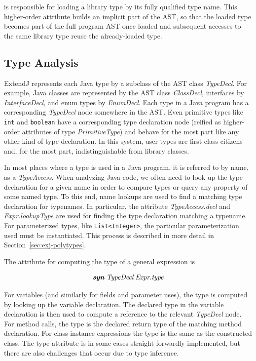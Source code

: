 \documentclass[10pt, twoside, openright]{book}
\newcommand{\secref}[1]{Section~\ref{#1}}
\begin{document}
\noindent
is responsible for loading a library type by its fully qualified type name.
This higher-order attribute builds an implicit part of the AST, so that the
loaded type becomes part of the full program AST once loaded and subsequent
accesses to the same library type reuse the already-loaded type.


\subsection{Type Analysis}
\label{sec:exj-type-anal}

ExtendJ represents each Java type by a subclass of the AST class \emph{TypeDecl}.
For example, Java classes are represented by the AST class \emph{ClassDecl},
interfaces by \emph{InterfaceDecl}, and enum types by \emph{EnumDecl}.
Each type in a Java program has a corresponding \emph{TypeDecl} node somewhere in the AST.
Even primitive types like \verb'int' and \verb'boolean'
have a corresponding type declaration node (reified as higher-order
attributes of type \emph{PrimitiveType}) and behave for the most part
like any other kind of type declaration.
In this system, user types are first-class citizens and, for the most part, indistinguishable
from library classes.

In most places where a type is used in a Java program, it is referred to
by name, as a \emph{TypeAccess}.
When analyzing Java code, we often need to look up the type declaration for a given name
in order to compare types or query any property of some named type.
To this end, name lookups are used to find a matching type declaration for typenames. In particular,
the attribute \emph{TypeAccess.decl} and \emph{Expr.lookupType} are used for finding the
type declaration matching a typename.
For parameterized types, like \verb'List<Integer>', the particular
parameterization used must be instantiated. This process is described in more detail
in \secref{sec:exj-polytypes}.

The attribute for computing the type of a general expression is

\begin{equation*}
\textbf{\textit{syn}} \; \textit{TypeDecl} \; \textit{Expr.type}
\end{equation*}

\noindent
For variables (and similarly for fields and parameter uses), the type is
computed by looking up the variable declaration. The declared type in the variable declaration
is then used to compute a reference to the relevant \emph{TypeDecl} node.
For method calls, the type is the declared return type of the matching method declaration.
For class instance
expressions the type is the same as the constructed class. The type attribute is in some cases
straight-forwardly implemented, but there are also challenges that occur due to type inference.
\end{document}
